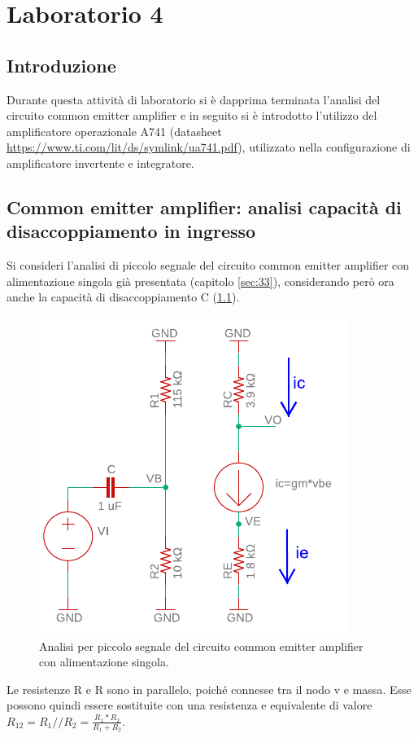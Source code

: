 \chapter{Laboratorio 4}
\section{Introduzione}
Durante questa attività di laboratorio si è dapprima terminata l'analisi del circuito common emitter amplifier e in seguito si è introdotto l'utilizzo del amplificatore operazionale \textmu A741 (datasheet \url{https://www.ti.com/lit/ds/symlink/ua741.pdf}), utilizzato nella configurazione di amplificatore invertente e integratore.

\section{Common emitter amplifier: analisi capacità di disaccoppiamento in ingresso}
Si consideri l'analisi di piccolo segnale del circuito common emitter amplifier con alimentazione singola già presentata (capitolo \ref{sec:33}), considerando però ora anche la capacità di disaccoppiamento C (\Fig\ref{fig:commonemitter_se_c_AC}).
\begin{figure}[h!]
	\centering
	\includegraphics[width=0.4\linewidth]{./OtherFiles/Laboratorio 4/common emitter_se_c-piccolo segnale-printout}
	\caption{Analisi per piccolo segnale del circuito common emitter amplifier con alimentazione singola.}
	\label{fig:commonemitter_se_c_AC}
\end{figure}

Le resistenze R e R sono in parallelo, poiché connesse tra il nodo v e massa. Esse possono quindi essere sostituite con una resistenza e equivalente di valore $R_{12}=R_1 // R_2=\frac{R_1*R_2}{R_1+R_2}$.

